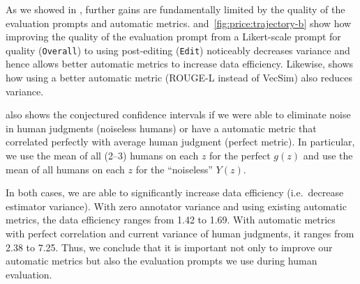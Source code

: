 As we showed in , further gains are fundamentally limited by the quality of the evaluation prompts and automatic metrics.
 and~\ref{fig:price:trajectory-b} show how improving the quality of the evaluation prompt from a Likert-scale prompt for quality (\texttt{Overall}) to using post-editing (\texttt{Edit}) noticeably decreases variance and hence allows better automatic metrics to increase data efficiency.
Likewise,  shows how using a better automatic metric (ROUGE-L instead of VecSim) also reduces variance.

 also shows the conjectured confidence intervals if we were able to eliminate noise in human judgments (noiseless humans) or have a automatic metric that correlated perfectly with average human judgment (perfect metric).
In particular, we use the mean of all (2--3) humans on each $z$ for the perfect $g(z)$ and use the mean of all humans on each $z$ for the ``noiseless'' $Y(z)$.

In both cases, we are able to significantly increase data efficiency (i.e.\ decrease estimator variance).
With zero annotator variance and using existing automatic metrics,
the data efficiency ranges from 1.42 to 1.69. With automatic metrics with perfect correlation and current variance of human judgments,
it ranges from 2.38 to 7.25.
Thus, we conclude that it is important not only to improve our automatic metrics but also the evaluation prompts we use during human evaluation. 
